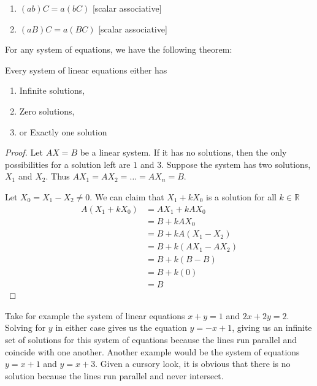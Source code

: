 \begin{enumerate}
\begin{proof}
\begin{align*}
\begin{bmatrix}
                    a*c_{mn}+b*c_{mn}
                    & a*c_{m1}+b*c_{m1} 
                    & a*c_{m2}+b*c_{m2} 
                    & \ldots 
                    a*c_{mn}+b*c_{mn} \\
                \end{bmatrix}\\
                &= aC + bC
            \end{align*}
        \end{proof}
    \item $(ab)C=a(bC)$ [scalar associative]
    \item $(aB)C=a(BC)$ [scalar associative]
\end{enumerate}

For any system of equations, we have the following theorem:
\begin{theorem}\label{lesolutions}
    Every system of linear equations either has
    \begin{enumerate}
        \item Infinite solutions,
        \item Zero solutions,
        \item or Exactly one solution
    \end{enumerate}
\end{theorem}

\begin{proof}
    Let $AX=B$ be a linear system. If it has no solutions, then the only
    possibilities for a solution left are $1$ and $3$. Suppose the system has
    two solutions, $X_1$ and $X_2$. Thus $AX_1=AX_2=\ldots=AX_n=B$.

    Let $X_0=X_1-X_2\neq 0$. We can claim that $X_1+kX_0$ is a solution for all
    $k \in \mathbb{R}$
    \begin{align*}
        A(X_1+kX_0)
        &= AX_1+kAX_0 \\
        &= B+kAX_0 \\
        &= B+kA(X_1-X_2) \\
        &= B+k(AX_1-AX_2) \\
        &= B+k(B-B)\\
        &= B+k(0)\\
        &= B
    \end{align*}
\end{proof}

Take for example the system of linear equations $x + y = 1$ and $2x + 2y =
2$. Solving for $y$ in either case gives us the equation $y=-x + 1$, giving
us an infinite set of solutions for this system of equations because the
lines run parallel and coincide with one another. Another example would be
the system of equations $y=x+1$ and $y=x+3$. Given a cursory look, it is
obvious that there is no solution because the lines run parallel and never
intersect.
